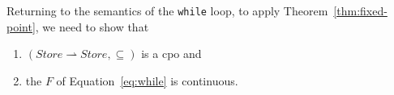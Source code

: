 \documentclass{tufte-handout}
\newtheorem{proposition}[theorem]{Proposition}
\begin{document}
Returning to the semantics of the \texttt{while} loop, to apply
Theorem~\ref{thm:fixed-point}, we need to show that
\begin{enumerate}
\item $(\mathit{Store}{\rightharpoonup}\mathit{Store},\subseteq)$ is a
  cpo and
\item the $F$ of Equation~\ref{eq:while} is continuous.
\end{enumerate}



\end{document}
